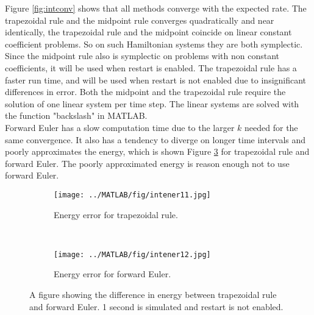 \noindent Figure \ref{fig:intconv} shows that all methods converge with the expected rate. 
The trapezoidal rule and the midpoint rule converges quadratically and near identically, the trapezoidal rule and the midpoint coincide on linear constant coefficient problems. So on such Hamiltonian systems they are both symplectic. Since the midpoint rule also is symplectic on problems with non constant coefficients, it will be used when restart is enabled. The trapezoidal rule has a faster run time, and will be used when restart is not enabled due to insignificant differences in error. Both the midpoint and the trapezoidal rule require the solution of one linear system per time step. The linear systems are solved with the function "backslash" in MATLAB. \\

\noindent Forward Euler has a slow computation time due to the larger $k$ needed for the same convergence. It also has a tendency to diverge on longer time intervals and poorly approximates the energy, which is shown Figure \ref{fig:forwardenergy} for trapezoidal rule and forward Euler. The poorly approximated energy is reason enough not to use forward Euler.%

\begin{figure}[H]
        \centering
        \begin{subfigure}[b]{0.3\textwidth}
                \texttt{[image: ../MATLAB/fig/intener11.jpg]}
                \caption{ Energy error for trapezoidal rule. }
                \label{fig:fe1}
        \end{subfigure}
        ~
        \begin{subfigure}[b]{0.3\textwidth}
                \texttt{[image: ../MATLAB/fig/intener12.jpg]}
                \caption{ Energy error for forward Euler. }  
				\label{fig:fe2}
        \end{subfigure}                
\caption{ A figure showing the difference in energy between trapezoidal rule and forward Euler. 1 second is simulated and restart is not enabled. }
\label{fig:forwardenergy}
\end{figure}


